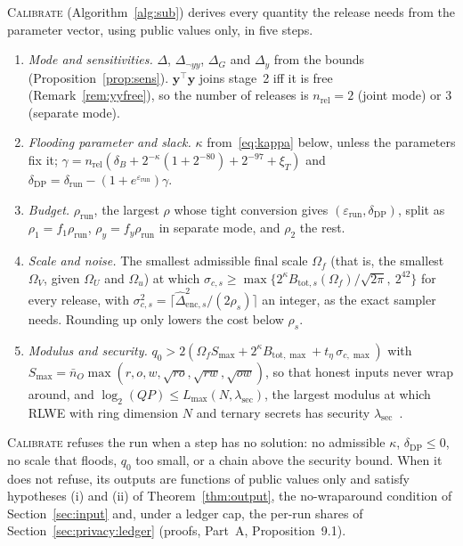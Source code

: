 \documentclass[11pt]{article}
\theoremstyle{definition}
\theoremstyle{plain}
\newcommand{\by}{\mathbf{y}}
\begin{document}
\textsc{Calibrate} (Algorithm~\ref{alg:sub}) derives every quantity the release needs from the parameter vector, using public values only, in five steps.
\begin{enumerate}[noitemsep, label=(\arabic*)]
  \item \emph{Mode and sensitivities.} $\Delta$, $\Delta_{\neg yy}$, $\Delta_G$ and $\Delta_y$ from the bounds (Proposition~\ref{prop:sens}). $\by^\top\by$ joins stage~2 iff it is free (Remark~\ref{rem:yyfree}), so the number of releases is $n_{\mathrm{rel}} = 2$ (joint mode) or $3$ (separate mode).
  \item \emph{Flooding parameter and slack.} $\kappa$ from~\eqref{eq:kappa} below, unless the parameters fix it; $\gamma = n_{\mathrm{rel}}(\delta_B + 2^{-\kappa}(1 + 2^{-80}) + 2^{-97} + \xi_T)$ and $\delta_{\mathrm{DP}} = \delta_{\mathrm{run}} - (1 + e^{\varepsilon_{\mathrm{run}}})\gamma$.
  \item \emph{Budget.} $\rho_{\mathrm{run}}$, the largest $\rho$ whose tight conversion gives $(\varepsilon_{\mathrm{run}}, \delta_{\mathrm{DP}})$, split as $\rho_1 = f_1\rho_{\mathrm{run}}$, $\rho_y = f_y\rho_{\mathrm{run}}$ in separate mode, and $\rho_2$ the rest.
  \item \emph{Scale and noise.} The smallest admissible final scale $\Omega_f$ (that is, the smallest $\Omega_V$, given $\Omega_U$ and $\Omega_u$) at which $\sigma_{c,s} \ge \max\{2^{\kappa}B_{\mathrm{tot},s}(\Omega_f)/\sqrt{2\pi},\ 2^{42}\}$ for every release, with $\sigma_{c,s}^2 = \lceil \widehat\Delta_{\mathrm{enc},s}^2/(2\rho_s) \rceil$ an integer, as the exact sampler needs. Rounding up only lowers the cost below $\rho_s$.
  \item \emph{Modulus and security.} $q_0 > 2(\Omega_f S_{\max} + 2^{\kappa}B_{\mathrm{tot},\max} + t_\eta\,\sigma_{c,\max})$ with $S_{\max} = \bar n_O\max(r, o, w, \sqrt{ro}, \sqrt{rw}, \sqrt{ow})$, so that honest inputs never wrap around, and $\log_2(QP) \le L_{\max}(N, \lambda_{\mathrm{sec}})$, the largest modulus at which RLWE with ring dimension $N$ and ternary secrets has security $\lambda_{\mathrm{sec}}$~\cite{albrecht2018he}.
\end{enumerate}
\textsc{Calibrate} refuses the run when a step has no solution: no admissible $\kappa$, $\delta_{\mathrm{DP}} \le 0$, no scale that floods, $q_0$ too small, or a chain above the security bound. When it does not refuse, its outputs are functions of public values only and satisfy hypotheses (i) and (ii) of Theorem~\ref{thm:output}, the no-wraparound condition of Section~\ref{sec:input} and, under a ledger cap, the per-run shares of Section~\ref{sec:privacy:ledger} (proofs, Part~A, Proposition~9.1).
\end{document}
